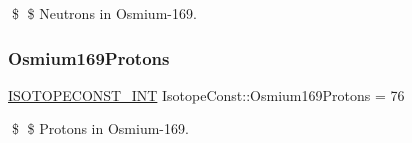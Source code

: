 \$ \$ Neutrons in Osmium-\/169. \mbox{\label{group___isotope_const-_osmium-_os169_gaa4c6cfd2ff74c08dedc6c8a52b1e3b2a}} 
\subsubsection{\texorpdfstring{Osmium169\+Protons}{Osmium169Protons}}
{\footnotesize\ttfamily \mbox{\hyperlink{group___isotope_const-_macros_ga5f18360b3e99483a35c32d789e62621c}{I\+S\+O\+T\+O\+P\+E\+C\+O\+N\+S\+T\+\_\+\+I\+NT}} Isotope\+Const\+::\+Osmium169\+Protons = 76}

\$ \$ Protons in Osmium-\/169. 